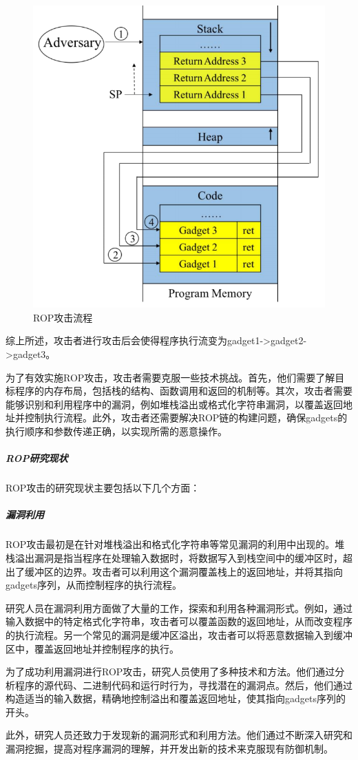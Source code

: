 \documentclass[UTF8,12pt,a4paper]{ctexart}
\numberwithin{figure}{section}
\begin{document}
\begin{figure}
    \centering
    \includegraphics[scale=0.35]{graph/ROP.png}
    \caption{ROP攻击流程}
    \label{ROP}
\end{figure}
综上所述，攻击者进行攻击后会使得程序执行流变为gadget1->gadget2->gadget3。

\par 为了有效实施ROP攻击，攻击者需要克服一些技术挑战。首先，他们需要了解目标程序的内存布局，包括栈的结构、函数调用和返回的机制等。其次，攻击者需要能够识别和利用程序中的漏洞，例如堆栈溢出或格式化字符串漏洞，以覆盖返回地址并控制执行流程。此外，攻击者还需要解决ROP链的构建问题，确保gadgets的执行顺序和参数传递正确，以实现所需的恶意操作。

\subparagraph{ROP研究现状}
ROP攻击的研究现状主要包括以下几个方面：
\subparagraph{漏洞利用}
\par ROP攻击最初是在针对堆栈溢出和格式化字符串等常见漏洞的利用中出现的。堆栈溢出漏洞是指当程序在处理输入数据时，将数据写入到栈空间中的缓冲区时，超出了缓冲区的边界。攻击者可以利用这个漏洞覆盖栈上的返回地址，并将其指向gadgets序列，从而控制程序的执行流程。
\par 研究人员在漏洞利用方面做了大量的工作，探索和利用各种漏洞形式。例如，通过输入数据中的特定格式化字符串，攻击者可以覆盖函数的返回地址，从而改变程序的执行流程。另一个常见的漏洞是缓冲区溢出，攻击者可以将恶意数据输入到缓冲区中，覆盖返回地址并控制程序的执行。
\par 为了成功利用漏洞进行ROP攻击，研究人员使用了多种技术和方法。他们通过分析程序的源代码、二进制代码和运行时行为，寻找潜在的漏洞点。然后，他们通过构造适当的输入数据，精确地控制溢出和覆盖返回地址，使其指向gadgets序列的开头。
\par 此外，研究人员还致力于发现新的漏洞形式和利用方法。他们通过不断深入研究和漏洞挖掘，提高对程序漏洞的理解，并开发出新的技术来克服现有防御机制。
\end{document}
